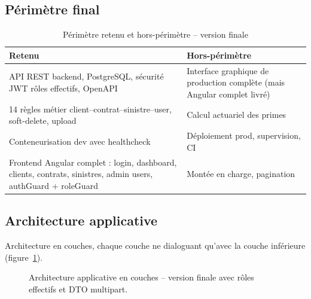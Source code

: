 \documentclass[a4paper,12pt]{article}
\begin{document}
\subsection{Périmètre final}
\begin{table}[htbp]
\centering
\caption{Périmètre retenu et hors-périmètre -- version finale}
\label{tab:perimetre}
\small
\begin{tabularx}{\linewidth}{@{}X X@{}}
\toprule
\textbf{Retenu} & \textbf{Hors-périmètre} \\
\midrule
API REST backend, PostgreSQL, sécurité JWT rôles effectifs, OpenAPI & Interface graphique de production complète (mais Angular complet livré) \\
14 règles métier client--contrat--sinistre--user, soft-delete, upload & Calcul actuariel des primes \\
Conteneurisation dev avec healthcheck & Déploiement prod, supervision, CI \\
Frontend Angular complet : login, dashboard, clients, contrats, sinistres, admin users, authGuard + roleGuard & Montée en charge, pagination \\
\bottomrule
\end{tabularx}
\end{table}

\subsection{Architecture applicative}
Architecture en couches, chaque couche ne dialoguant qu'avec la couche inférieure (figure~\ref{fig:archi}).

\begin{figure}[htbp]
\centering
{}
\caption{Architecture applicative en couches -- version finale avec rôles effectifs et DTO multipart.}
\label{fig:archi}
\end{figure}
\end{document}
